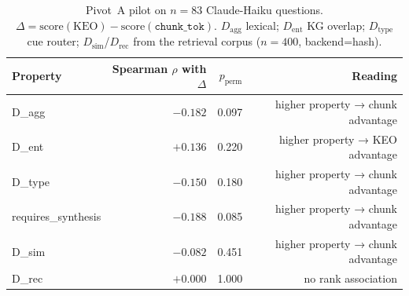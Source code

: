 \begin{table}[t]
\centering
\small
\begin{tabular}{lrrr}
\toprule
Property & Spearman $\rho$ with $\Delta$ & $p_{\mathrm{perm}}$ & Reading \\
\midrule
D\_agg & $-0.182$ & 0.097 & higher property → chunk advantage \\
D\_ent & $+0.136$ & 0.220 & higher property → KEO advantage \\
D\_type & $-0.150$ & 0.180 & higher property → chunk advantage \\
requires\_synthesis & $-0.188$ & 0.085 & higher property → chunk advantage \\
D\_sim & $-0.082$ & 0.451 & higher property → chunk advantage \\
D\_rec & $+0.000$ & 1.000 & no rank association \\
\bottomrule
\end{tabular}
\caption{Pivot~A pilot on $n=83$ Claude-Haiku questions. $\Delta = \mathrm{score}(\mathrm{KEO}) - \mathrm{score}(\texttt{chunk\_tok})$. $D_{\mathrm{agg}}$ lexical; $D_{\mathrm{ent}}$ KG overlap; $D_{\mathrm{type}}$ cue router; $D_{\mathrm{sim}}$/$D_{\mathrm{rec}}$ from the retrieval corpus ($n=400$, backend=hash).}
\label{tab:dispersion-pilot}
\end{table}
